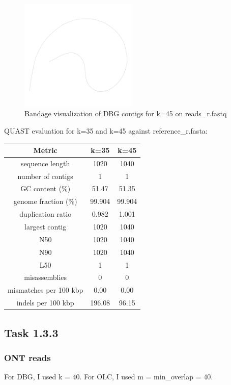 \documentclass[12pt]{article}
\begin{document}
\begin{figure}[h]
    \centering
    \includegraphics[width=0.5\textwidth]{../toy_dataset/r-k-45.png}
    \caption{Bandage visualization of DBG contigs for k=45 on reads\_r.fastq}
\end{figure} 

QUAST evaluation for k=35 and k=45 against reference\_r.fasta:

\begin{center}
\begin{tabular}{ |c|c|c| }
    \hline
    Metric & k=35 & k=45 \\
    \hline
    sequence length & 1020 & 1040 \\
    number of contigs & 1 & 1 \\
    GC content (\%) & 51.47 & 51.35 \\
    genome fraction (\%) & 99.904 & 99.904 \\
    duplication ratio & 0.982 & 1.001 \\
    largest contig & 1020 & 1040 \\
    N50 & 1020 & 1040 \\
    N90 & 1020 & 1040 \\
    L50 & 1 & 1 \\
    misassemblies & 0 & 0 \\
    mismatches per 100 kbp & 0.00 & 0.00 \\
    indels per 100 kbp & 196.08 & 96.15 \\
    \hline
\end{tabular}
\end{center}


\subsection{Task 1.3.3}

\subsubsection{ONT reads}
For DBG, I used k = 40. For OLC, I used m = min\_overlap = 40.
\end{document}
